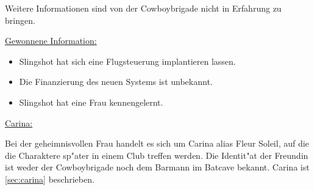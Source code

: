 Weitere Informationen sind von der Cowboybrigade nicht in Erfahrung zu bringen.

\begin{remarks}
	\underline{Gewonnene Information:}

	\begin{itemize}
		\item Slingshot hat sich eine Flugsteuerung implantieren lassen. 
		\item Die Finanzierung des neuen Systems ist unbekannt.
		\item Slingshot hat eine Frau kennengelernt.
	\end{itemize}

	\underline{Carina:}
	
	Bei der geheimnisvollen Frau handelt es sich um Carina alias Fleur Soleil, auf die die Charaktere sp"ater in einem Club treffen werden. Die Identit"at der Freundin ist weder der Cowboybrigade noch dem Barmann im Batcave bekannt. Carina ist \cref{sec:carina} beschrieben.
\end{remarks}
